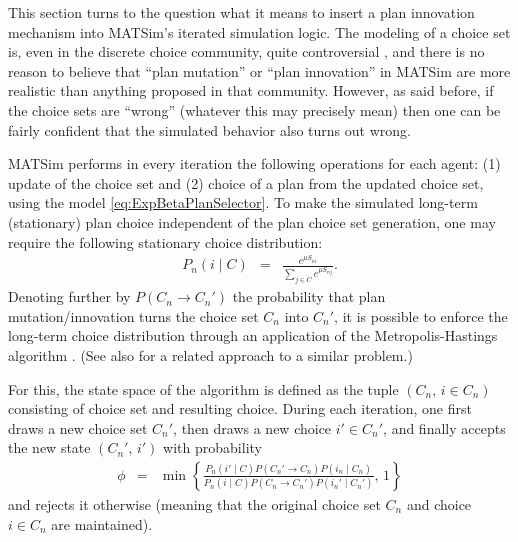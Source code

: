 This section turns to the question what it means to insert a plan
innovation mechanism into MATSim's iterated simulation logic. The
modeling of a choice set is, even in the discrete choice community,
quite controversial \citep{frejinger-2010}, and there is no reason
to believe that {}``plan mutation'' or {}``plan innovation'' in
MATSim are more realistic than anything proposed in that community.
However, as said before, if the choice sets are {}``wrong'' (whatever
this may precisely mean) then one can be fairly confident that the
simulated behavior also turns out wrong. 

MATSim performs in every iteration the following operations for each
agent: (1) update of the choice set and (2) choice of a plan from
the updated choice set, using the model \ref{eq:ExpBetaPlanSelector}.
To make the simulated long-term (stationary) plan choice independent
of the plan choice set generation, one may require the following stationary
choice distribution:
\begin{eqnarray}
P_{n}(i\mid C) & = & \frac{e^{\mu S_{ni}}}{\sum_{j\in C}e^{\mu S_{nj}}}.\label{eq:global-choice-model}
\end{eqnarray}
Denoting further by $P(C_{n}\rightarrow C_{n}')$ the probability
that plan mutation/innovation turns the choice set $C_{n}$ into $C_{n}'$,
it is possible to enforce the long-term choice distribution 
through an application of the Metropolis-Hastings algorithm \citep{hastings-1970}.
(See also \citet{floetteroed-2012b} for a related approach to a similar
problem.)

For this, the state space of the algorithm is defined as the tuple
$(C_{n},\, i\in C_{n})$ consisting of choice set and resulting choice.
During each iteration, one first draws a new choice set $C_{n}'$,
then draws a new choice $i'\in C_{n}'$, and finally accepts the new
state $(C_{n}',\, i')$ with probability
\begin{eqnarray}
\phi & = & \min\left\{ \frac{{\displaystyle P_{n}(i'\mid C)P(C_{n}'\rightarrow C_{n})P(i_{n}\mid C_{n})}}{{\displaystyle P_{n}(i\mid C)P(C_{n}\rightarrow C_{n}')P(i_{n}'\mid C_{n}')}},\,1\right\} \label{eq:accept-proba-1}
\end{eqnarray}
and rejects it otherwise (meaning that the original choice set $C_{n}$
and choice $i\in C_{n}$ are maintained).


